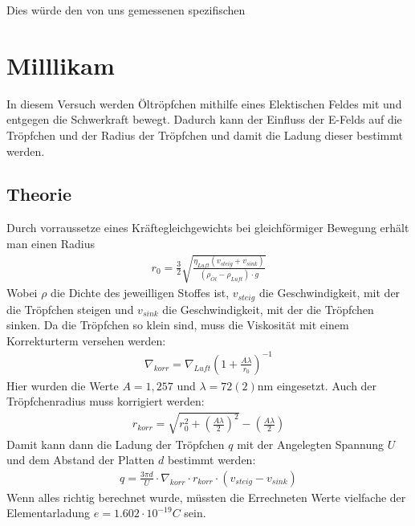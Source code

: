 \documentclass[11pt, a4paper]{article}
\begin{document}
        Dies würde den von uns gemessenen spezifischen 


    \section{Milllikam}

    In diesem Versuch werden Öltröpfchen mithilfe eines Elektischen Feldes mit und entgegen die Schwerkraft bewegt. Dadurch kann der Einfluss der E-Felds auf die Tröpfchen und der Radius der Tröpfchen und damit die Ladung dieser bestimmt werden.

    \subsection{Theorie}

    Durch vorraussetze eines Kräftegleichgewichts bei gleichförmiger Bewegung erhält man einen Radius
    \begin{align}
        r_0 = \frac{3}{2} \sqrt{\frac{\eta_{Luft} (v_{steig} + v_{sink})}{(\rho_{\ddot{Ol}} - \rho_{Luft}) \cdot g}}%
    \end{align}
    Wobei $\rho$ die Dichte des jeweilligen Stoffes ist, $v_{steig}$ die Geschwindigkeit, mit der die Tröpfchen steigen und $v_{sink}$ die Geschwindigkeit, mit der die Tröpfchen sinken. Da die Tröpfchen so klein sind, muss die Viskosität mit einem Korrekturterm versehen werden:
    \begin{align}
        \nabla_{korr} = \nabla_{Luft}(1+\frac{A \lambda}{r_0})^{-1}
    \end{align}
    Hier wurden die Werte $A = 1,257$ und $\lambda = 72(2) \si{\nano\metre}$ eingesetzt.
    Auch der Tröpfchenradius muss korrigiert werden:
    \begin{align}
        r_{korr} = \sqrt{r_0^2 + (\frac{A \lambda}{2})^2} - (\frac{A \lambda}{2})
    \end{align}
    Damit kann dann die Ladung der Tröpfchen $q$ mit der Angelegten Spannung $U$ und dem Abstand der Platten $d$ bestimmt werden:
    \begin{align}
        q = \frac{3 \pi d}{U} \cdot \nabla_{korr} \cdot r_{korr} \cdot (v_{steig} - v_{sink})
    \end{align}
    Wenn alles richtig berechnet wurde, müssten die Errechneten Werte vielfache der Elementarladung $e = 1.602 \cdot 10^{-19} \si{C}$ sein.
\end{document}
